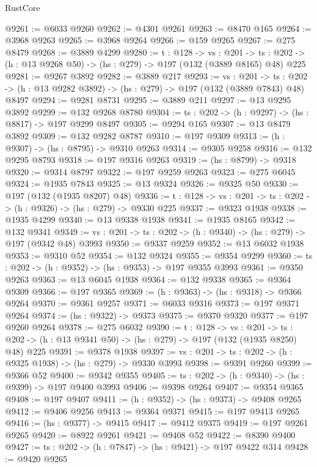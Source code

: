 \begin{lexlean}{RustCore}
\begin{coremodule}
@9261 := @6033 @9260
@9262 := @4301 @9261
@9263 := @8470 @165
@9264 := @3968 @9263
@9265 := @3968 @9264
@9266 := @159 @9265
@9267 := @275 @8479
@9268 := @3889 @4299
@9280 := {t : @128} ->
  {vs : @201} ->
  {ts : @202} -> (h : @13 @9268 @50) -> (hs : @279) -> @197 (@132 (@3889 @8165) @48) @225
@9281 := @9267 @3892
@9282 := @3889 @217
@9293 := {vs : @201} ->
  {ts : @202} -> (h : @13 @9282 @3892) -> (hs : @279) -> @197 (@132 (@3889 @7843) @48) @8497
@9294 := @9281 @8731
@9295 := @3889 @211
@9297 := @13 @9295 @3892
@9299 := @132 @9268 @8780
@9304 := {ts : @202} -> (h : @9297) -> (hs : @8817) -> @197 @9299 @8497
@9305 := @9294 @165
@9307 := @13 @8479 @3892
@9309 := @132 @9282 @8787
@9310 := @197 @9309
@9313 := (h : @9307) -> (hs : @8795) -> @9310 @9263
@9314 := @9305 @9258
@9316 := @132 @9295 @8793
@9318 := @197 @9316 @9263
@9319 := (hs : @8799) -> @9318
@9320 := @9314 @8797
@9322 := @197 @9259 @9263
@9323 := @275 @6045
@9324 := @1935 @7843
@9325 := @13 @9324
@9326 := @9325 @50
@9330 := @197 (@132 (@1935 @8207) @48)
@9336 := {t : @128} -> {vs : @201} -> {ts : @202} -> (h : @9326) -> (hs : @279) -> @9330 @225
@9337 := @9323 @1938
@9338 := @1935 @4299
@9340 := @13 @9338 @1938
@9341 := @1935 @8165
@9342 := @132 @9341
@9349 := {vs : @201} -> {ts : @202} -> (h : @9340) -> (hs : @279) -> @197 (@9342 @48) @3993
@9350 := @9337 @9259
@9352 := @13 @6032 @1938
@9353 := @9310 @52
@9354 := @132 @9324
@9355 := @9354 @9299
@9360 := {ts : @202} -> (h : @9352) -> (hs : @9353) -> @197 @9355 @3993
@9361 := @9350 @9263
@9363 := @13 @6045 @1938
@9364 := @132 @9338
@9365 := @9364 @9309
@9366 := @197 @9365
@9369 := (h : @9363) -> (hs : @9318) -> @9366 @9264
@9370 := @9361 @9257
@9371 := @6033 @9316
@9373 := @197 @9371 @9264
@9374 := (hs : @9322) -> @9373
@9375 := @9370 @9320
@9377 := @197 @9260 @9264
@9378 := @275 @6032
@9390 := {t : @128} ->
  {vs : @201} ->
  {ts : @202} -> (h : @13 @9341 @50) -> (hs : @279) -> @197 (@132 (@1935 @8250) @48) @225
@9391 := @9378 @1938
@9397 := {vs : @201} -> {ts : @202} -> (h : @9325 @1938) -> (hs : @279) -> @9330 @3993
@9398 := @9391 @9260
@9399 := @9366 @52
@9400 := @9342 @9355
@9405 := {ts : @202} -> (h : @9340) -> (hs : @9399) -> @197 @9400 @3993
@9406 := @9398 @9264
@9407 := @9354 @9365
@9408 := @197 @9407
@9411 := (h : @9352) -> (hs : @9373) -> @9408 @9265
@9412 := @9406 @9256
@9413 := @9364 @9371
@9415 := @197 @9413 @9265
@9416 := (hs : @9377) -> @9415
@9417 := @9412 @9375
@9419 := @197 @9261 @9265
@9420 := @8922 @9261
@9421 := @9408 @52
@9422 := @8390 @9400
@9427 := {ts : @202} -> (h : @7847) -> (hs : @9421) -> @197 @9422 @314
@9428 := @9420 @9265

\end{coremodule}
\end{lexlean}
